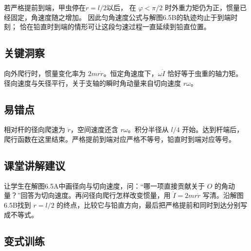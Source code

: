 \documentclass[UTF8,fontset=fandol,a4paper,11pt]{ctexart}
\begin{document}
若严格提前到端，甲虫停在$r=l/2$以后，
在 $\varphi<\pi/2$ 时外重力矩仍为正，惯量已经固定，角速度随之增加。
因此匀角速度公式与解图6.5B的轨迹均止于到端时刻；
恰在铅直时到端的情形可让这段匀速过程一直延续到铅直位置。




\subsection*{关键洞察}

向外爬行时，惯量变化率为 $2mr\dot r$。恒定角速度下，$\omega\dot I$ 恰好等于虫重的轴力矩。径向速度与矢径平行，关于支轴的瞬时角动量来自切向速度 $r\omega$。



\subsection*{易错点}

相对杆的径向爬速为 $\dot r$，空间速度还含 $r\omega$。积分半径从 $l/4$ 开始。达到杆端后，爬行函数在这里结束。严格提前到端对应严格不等号，铅直时到端对应等号。



\subsection*{课堂讲解建议}

让学生在解图6.5A中画径向与切向速度，问：“哪一项直接贡献关于 $O$ 的角动量？”回答为切向速度。再问径向爬行怎样改变惯量，用 $\dot I=2mr\dot r$ 写清。沿解图6.5B找到 $r=l/2$ 的终点，比较它与铅直方向，最后把严格提前和同时到达分别写成不等式。




\subsection*{变式训练}
\end{document}
